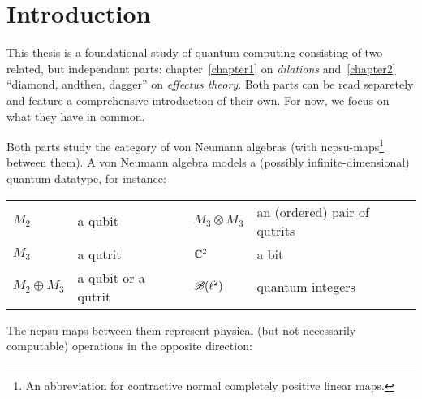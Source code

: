 \documentclass[b]{subfiles}
\begin{document}
\chapter{Introduction}
\begin{parsec}%
\begin{point}%
This thesis is a foundational study of quantum computing consisting
    of two related, but independant parts:
    chapter~\ref{chapter1} on \emph{dilations} and~\ref{chapter2}
    ``diamond, andthen, dagger'' on \emph{effectus theory}.
Both parts can be read separetely
    and feature a comprehensive introduction of their own.
For now, we focus on what they have in common.
\begin{point}%
Both parts study the category of von Neumann algebras
    (with ncpsu-maps\footnote{%
        An abbreviation for contractive normal completely
        positive linear maps.} between them).
A von Neumann algebra models a (possibly infinite-dimensional)
    quantum datatype, for instance:
\begin{center}
    \begin{tabular}{llll}
        $M_2$ & a qubit & $M_3 \otimes M_3$ & an (ordered) pair of qutrits \\
        $M_3$ & a qutrit & $\mathbb{C}^2$ & a bit \\
        $M_2 \oplus M_3$ & a qubit or a qutrit
        & $\mathscr{B}(\ell^2)$ & quantum integers
\end{tabular}
\end{center}
The ncpsu-maps between them represent physical
    (but not necessarily computable) operations
        in the opposite direction:
\end{point}
\end{point}
\end{parsec}
\end{document}
